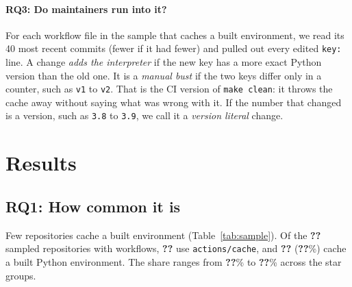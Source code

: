 \documentclass[10pt,a4paper]{article}
\newcommand{\ck}[1]{\textbf{??}}\newcommand{\repourl}{\url{https://github.com/mark124/cache-key-soundness}}%
\begin{document}
\paragraph{RQ3: Do maintainers run into it?}
For each workflow file in the sample that caches a built environment, we read
its 40 most recent commits (fewer if it had fewer) and pulled out every
edited \texttt{key:} line. A change \emph{adds the interpreter} if the new key has a
more exact Python version than the old one. It is a \emph{manual bust} if the
two keys differ only in a counter, such as \texttt{v1} to \texttt{v2}. That is
the CI version of \texttt{make clean}: it throws the cache away without saying
what was wrong with it. If the number that changed is a version, such as
\texttt{3.8} to \texttt{3.9}, we call it a \emph{version literal} change.

\section{Results}

\subsection{RQ1: How common it is}
\label{sec:rq1}

\begin{table}[t]\centering\small
\caption{Sample and how many repositories cache a built environment, by star
count. Produced by \texttt{make table1} from
\texttt{results/table1\_sample.csv}.}
\label{tab:sample}
\end{table}

\begin{table}[t]\centering\small
\caption{Verdicts for the \ck{h.built_env_steps} cache steps that store a
built Python environment. Produced by \texttt{make table2} from
\texttt{results/table2\_key\_composition.csv}.}
\label{tab:keys}
\end{table}

Few repositories cache a built environment (Table~\ref{tab:sample}). Of the
\ck{h.repos_with_workflows} sampled repositories with workflows,
\ck{h.repos_with_actions_cache} use \texttt{actions/cache}, and
\ck{h.repos_caching_built_env} (\ck{h.pct_workflow_repos_caching_built_env}\%)
cache a built Python environment. The share ranges from
\ck{h.pct_caching_built_env_min_stratum}\% to
\ck{h.pct_caching_built_env_max_stratum}\% across the star groups.
\end{document}
